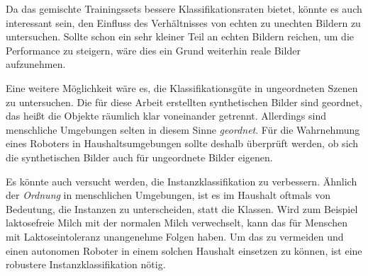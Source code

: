 Da das gemischte Trainingssets bessere Klassifikationsraten bietet, könnte es auch interessant sein, den Einfluss des Verhältnisses von echten zu unechten Bildern zu untersuchen. Sollte schon ein sehr kleiner Teil an echten Bildern reichen, um die Performance zu steigern, wäre dies ein Grund weiterhin reale Bilder aufzunehmen. \par 

Eine weitere Möglichkeit wäre es, die Klassifikationsgüte in ungeordneten Szenen zu untersuchen. Die für diese Arbeit erstellten synthetischen Bilder sind geordnet, das heißt die Objekte räumlich klar voneinander getrennt. Allerdings sind menschliche Umgebungen selten in diesem Sinne \textit{geordnet}. Für die Wahrnehmung eines Roboters in Haushaltsumgebungen sollte deshalb überprüft werden, ob sich die synthetischen Bilder auch für ungeordnete Bilder eigenen. \par 

Es könnte auch versucht werden, die Instanzklassifikation zu verbessern. Ähnlich der \textit{Ordnung} in menschlichen Umgebungen, ist es im Haushalt oftmals von Bedeutung, die Instanzen zu unterscheiden, statt die Klassen. Wird zum Beispiel laktosefreie Milch mit der normalen Milch verwechselt, kann das für Menschen mit Laktoseintoleranz unangenehme Folgen haben. Um das zu vermeiden und einen autonomen Roboter in einem solchen Haushalt einsetzen zu können, ist eine robustere Instanzklassifikation nötig. 